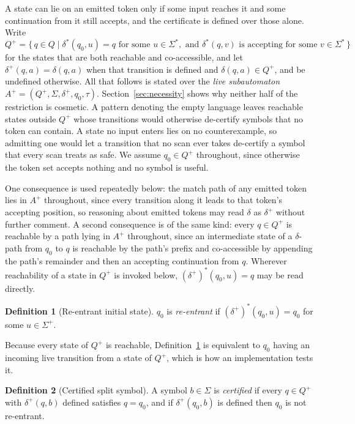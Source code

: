 \documentclass[11pt,a4paper]{article}
\theoremstyle{definition}
\newtheorem{definition}{Definition}
\theoremstyle{plain}
\begin{document}
A state can lie on an emitted token only if some input reaches it and some continuation from it still accepts, and the
certificate is defined over those alone. Write \[ Q^+ = \{\, q \in Q \mid \delta^*(q_0, u) = q \text{ for some } u \in
\Sigma^*, \text{ and } \delta^*(q, v) \text{ is accepting for some } v \in \Sigma^* \,\}
\] for the states that are both reachable and co-accessible, and let $\delta^+(q, a) = \delta(q, a)$ when that
transition is defined and $\delta(q, a) \in Q^+$, and be undefined otherwise. All that follows is stated over the
\emph{live subautomaton} $A^+ = (Q^+, \Sigma, \delta^+, q_0, \tau)$. Section~\ref{sec:necessity} shows why neither half
of the restriction is cosmetic. A pattern denoting the empty language leaves reachable states outside $Q^+$ whose
transitions would otherwise de-certify symbols that no token can contain. A state no input enters lies on no
counterexample, so admitting one would let a transition that no scan ever takes de-certify a symbol that every scan
treats as safe. We assume $q_0 \in Q^+$ throughout, since otherwise the token set accepts nothing and no symbol is
useful.

One consequence is used repeatedly below: the match path of any emitted token lies in $A^+$ throughout, since every
transition along it leads to that token's accepting position, so reasoning about emitted tokens may read $\delta$ as
$\delta^+$ without further comment. A second consequence is of the same kind: every $q \in Q^+$ is reachable by a path
lying in $A^+$ throughout, since an intermediate state of a $\delta$-path from $q_0$ to $q$ is reachable by the path's
prefix and co-accessible by appending the path's remainder and then an accepting continuation from $q$. Wherever
reachability of a state in $Q^+$ is invoked below, $(\delta^+)^*(q_0, u) = q$ may be read directly.

\begin{definition}[Re-entrant initial state]
\label{def:reentrant}
$q_0$ is \emph{re-entrant} if $(\delta^+)^*(q_0, u) = q_0$ for some $u \in \Sigma^+$.
\end{definition}

Because every state of $Q^+$ is reachable, Definition~\ref{def:reentrant} is equivalent to $q_0$ having an incoming live
transition from a state of $Q^+$, which is how an implementation tests it.

\begin{definition}[Certified split symbol]
\label{def:certified}
A symbol $b \in \Sigma$ is \emph{certified} if every $q \in Q^+$ with $\delta^+(q, b)$ defined satisfies $q = q_0$, and
if $\delta^+(q_0, b)$ is defined then $q_0$ is not re-entrant.
\end{definition}
\end{document}

